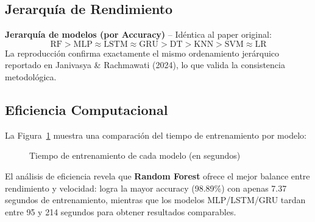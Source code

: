\documentclass[12pt,a4paper]{article}
\begin{document}
\subsection{Jerarquía de Rendimiento}

\begin{cajaResultado}
\textbf{Jerarquía de modelos (por Accuracy)} -- Idéntica al paper original:
\[
\text{RF} > \text{MLP} \approx \text{LSTM} \approx \text{GRU} > \text{DT} > \text{KNN} > \text{SVM} \approx \text{LR}
\]
La reproducción confirma exactamente el mismo ordenamiento jerárquico reportado en
Janivasya \& Rachmawati (2024), lo que valida la consistencia metodológica.
\end{cajaResultado}

\subsection{Eficiencia Computacional}

La Figura~\ref{fig:tiempo} muestra una comparación del tiempo de entrenamiento por modelo:

\begin{figure}[H]
\centering
{}
\caption{Tiempo de entrenamiento de cada modelo (en segundos)}
\label{fig:tiempo}
\end{figure}

El análisis de eficiencia revela que \textbf{Random Forest} ofrece el mejor balance entre
rendimiento y velocidad: logra la mayor accuracy (98.89\%) con apenas 7.37 segundos de entrenamiento,
mientras que los modelos MLP/LSTM/GRU tardan entre 95 y 214 segundos para obtener resultados comparables.

\end{document}
